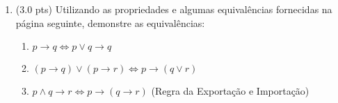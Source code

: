 \documentclass[12pt]{article}
\begin{document}
\begin{enumerate}
\begin{enumerate}

\end{enumerate}


\item (3.0 pts) Utilizando as propriedades e algumas equivalências
fornecidas na página seguinte, demonstre as equivalências:
\begin{enumerate}
\setlength{\itemsep}{-2pt}

\item $p \rightarrow q \Leftrightarrow p \vee q \rightarrow  q$ %

\item  $(p \rightarrow q) \vee (p \rightarrow r) \Leftrightarrow p  \rightarrow  (q \vee r) $ %


\item $p \wedge q \rightarrow r \Leftrightarrow p \rightarrow (q \rightarrow r) $  (Regra da Exportação e Importação) %








\end{enumerate}
\end{enumerate}
\end{document}
